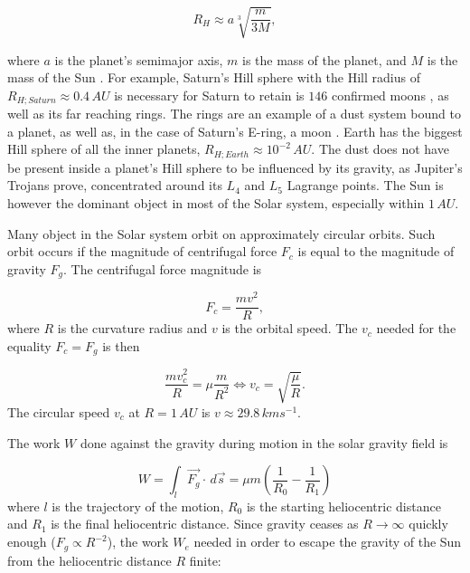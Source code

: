\begin{equation}
    R_H \approx a \sqrt[3]{\frac{m}{3M}},
\end{equation}

where $a$ is the planet's semimajor axis, $m$ is the mass of the planet, and $M$ is the mass of the Sun \cite{sheppard2023new}. For example, Saturn's Hill sphere with the Hill radius of $R_{H;Saturn} \approx 0.4 \, \si{AU}$ is necessary for Saturn to retain is $146$ confirmed moons \citep{sheppard2023new}, as well as its far reaching rings. The rings are an example of a dust system bound to a planet, as well as, in the case of Saturn's E-ring, a moon \citep{kempf2010enceladus}. Earth has the biggest Hill sphere of all the inner planets, $R_{H;Earth} \approx 10^{-2} \, \si{AU}$. The dust does not have be present inside a planet's Hill sphere to be influenced by its gravity, as Jupiter's Trojans prove, concentrated around its $L_4$ and $L_5$ Lagrange points. The Sun is however the dominant object in most of the Solar system, especially within $1 \, \si{AU}$.

Many object in the Solar system orbit on approximately circular orbits. Such orbit occurs if the magnitude of centrifugal force $F_c$ is equal to the magnitude of gravity $F_g$. The centrifugal force magnitude is 

\begin{equation}
    F_c = \frac{m v^2}{R}, 
\end{equation}
where $R$ is the curvature radius and $v$ is the orbital speed. The $v_c$ needed for the equality $F_c = F_g$ is then

\begin{equation}
    \frac{m v_c^2}{R} = \mu \frac{m}{R^2} \Leftrightarrow v_c = \sqrt{\frac{\mu}{R}}.
    \label{eq:circular_speed}
\end{equation}
The circular speed $v_c$ at $R = 1 \, \si{AU}$ is $v \approx 29.8 \, \si{km s^{-1}}$. 

The work $W$ done against the gravity during motion in the solar gravity field is

\begin{equation}
    W = \int_{l} \vec{F_g} \cdot \, d\vec{s} = \mu m \left( \frac{1}{R_0} - \frac{1}{R_1} \right)
\end{equation}
where $l$ is the trajectory of the motion, $R_0$ is the starting heliocentric distance and $R_1$ is the final heliocentric distance. Since gravity ceases as $R \to \infty$ quickly enough ($F_g \propto R^{-2}$), the work $W_e$ needed in order to escape the gravity of the Sun from the heliocentric distance $R$ finite:

